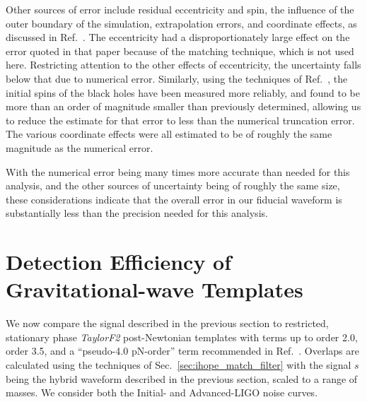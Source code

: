 Other sources of error include residual eccentricity and spin, the
influence of the outer boundary of the simulation, extrapolation
errors, and coordinate effects, as discussed in Ref.~\cite{Boyle2007}.
The eccentricity had a disproportionately large effect on the error
quoted in that paper because of the matching technique, which is not
used here.  Restricting attention to the other effects of
eccentricity, the uncertainty falls below that due to numerical error.
Similarly, using the techniques of Ref.~\cite{Lovelace2008}, the
initial spins of the black holes have been measured more reliably, and
found to be more than an order of magnitude smaller than previously
determined, allowing us to reduce the estimate for that error to less
than the numerical truncation error.  The various coordinate effects
were all estimated to be of roughly the same magnitude as the
numerical error.

With the numerical error being many times more accurate than needed
for this analysis, and the other sources of uncertainty being of
roughly the same size, these considerations indicate that the overall
error in our fiducial waveform is substantially less than the
precision needed for this analysis.


\section{Detection Efficiency of Gravitational-wave Templates}
\label{sec:Efficiency} %

We now compare the signal described in the previous section to
restricted, stationary phase \textit{TaylorF2} post-Newtonian
templates with terms up to order 2.0, order 3.5, and a ``pseudo-4.0
pN-order'' term recommended in Ref.~\cite{Pan2007}.  Overlaps are
calculated using the techniques of Sec.~\ref{sec:ihope_match_filter}
with the signal $s$ being the hybrid waveform described in the
previous section, scaled to a range of masses.  We consider both the
Initial- and Advanced-LIGO noise curves.

